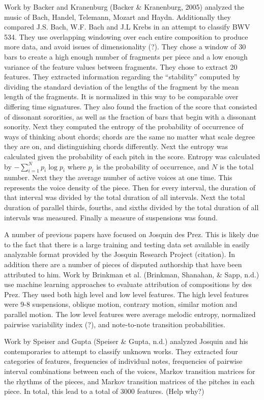 \documentclass[12pt,twoside]{reedthesis}
\theoremstyle{definition}
\theoremstyle{definition}
\theoremstyle{definition}
\theoremstyle{remark}
\begin{document}
Work by Backer and Kranenburg (Backer \& Kranenburg, 2005) analyzed the
music of Bach, Handel, Telemann, Mozart and Haydn. Additionally they
compared J.S. Bach, W.F. Bach and J.L Krebs in an attempt to classify
BWV 534. They use overlapping windowing over each entire composition to
produce more data, and avoid issues of dimensionality (?). They chose a
window of 30 bars to create a high enough number of fragments per piece
and a low enough variance of the feature values between fragments. They
chose to extract 20 features. They extracted information regarding the
``stability'' computed by dividing the standard deviation of the lengths
of the fragment by the mean length of the fragments. It is normalized in
this way to be comparable over differing time signatures. They also
found the fraction of the score that consisted of dissonant sororities,
as well as the fraction of bars that begin with a dissonant sonority.
Next they computed the entropy of the probability of occurrence of ways
of thinking about chords; chords are the same no matter what scale
degree they are on, and distinguishing chords differently. Next the
entropy was calculated given the probability of each pitch in the score.
Entropy was calculated by \(-\sum_{i = 1}^{N}p_i\log{p_i}\) where
\(p_i\) is the probability of occurrence, and \(N\) is the total number.
Next they the average number of active voices at one time. This
represents the voice density of the piece. Then for every interval, the
duration of that interval was divided by the total duration of all
intervals. Next the total duration of parallel thirds, fourths, and
sixths divided by the total duration of all intervals was measured.
Finally a measure of suspensions was found.

A number of previous papers have focused on Josquin des Prez. This is
likely due to the fact that there is a large training and testing data
set available in easily analyzable format provided by the Josquin
Research Project (citation). In addition there are a number of pieces of
disputed authorship that have been attributed to him. Work by Brinkman
et al. (Brinkman, Shanahan, \& Sapp, n.d.) use machine learning
approaches to evaluate attribution of compositions by des Prez. They
used both high level and low level features. The high level features
were 9-8 suspensions, oblique motion, contrary motion, similar motion
and parallel motion. The low level features were average melodic
entropy, normalized pairwise variability index (?), and note-to-note
transition probabilities.

Work by Speiser and Gupta (Speiser \& Gupta, n.d.) analyzed Josquin and
his contemporaries to attempt to classify unknown works. They extracted
four categories of features, frequencies of individual notes,
frequencies of pairwise interval combinations between each of the
voices, Markov transition matrices for the rhythms of the pieces, and
Markov transition matrices of the pitches in each piece. In total, this
lead to a total of 3000 features. (Help why?)
\end{document}
